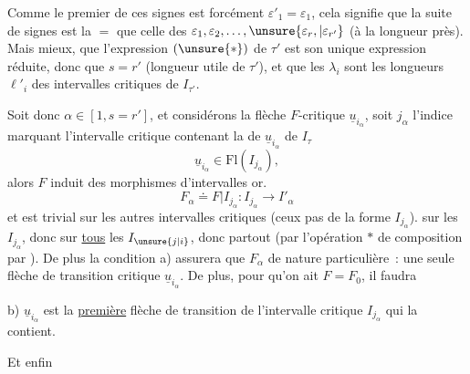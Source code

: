 Comme le  premier de ces signes est forcément $\varepsilon'_1=\varepsilon_1$, cela signifie que  la suite de signes est la $=$ que celle des $\varepsilon_1,\varepsilon_2,\ldots,\unsure{\varepsilon_r,|\varepsilon_{r'}}$ (à la longueur près). Mais mieux, que l'expression $(\unsure{*})$ de $\tau'$ est son unique expression réduite, donc que $s=r'$ (longueur utile de $\tau'$), et que les $\lambda_i$ sont les longueurs $\ell'_i$ des intervalles critiques de $I_{\tau'}$.

 Soit donc $\alpha\in[1,s=r']$, et considérons la flèche  $F$-critique $\underline{u}_{i_\alpha}$, soit $j_\alpha$ l'indice marquant l'intervalle critique  contenant la  de $\underline{u}_{i_\alpha}$ de $I_\tau$
\[
\underline{u}_{i_\alpha}\in\mathrm{Fl}(I_{j_\alpha}),
\]
alors $F$ induit des morphismes  d'intervalles or.
\[
F_\alpha\doteq F|I_{j_\alpha}:I_{j_\alpha}\longrightarrow I'_\alpha
\]
et est trivial sur les autres intervalles critiques (ceux pas de la forme $I_{j_\alpha}$).    sur les $I_{j_\alpha}$, donc sur \uline{tous} les $I_{\unsure{j|i}}$, donc partout (par l'opération $*$ \deleted{\unsure{$\}$}} de composition par ). De plus  la condition a)
assurera que   $F_\alpha$  de nature  particulière~: une seule flèche de transition critique $\underline{u}_{i_\alpha}$. De plus, pour qu'on ait $F=F_0$, il faudra

b)  \inserted{$\forall\alpha\in[1,r']$} $\underline{u}_{i_\alpha}$ est la \uline{première} flèche de transition de l'intervalle critique $I_{j_\alpha}$ qui la contient.

Et enfin

